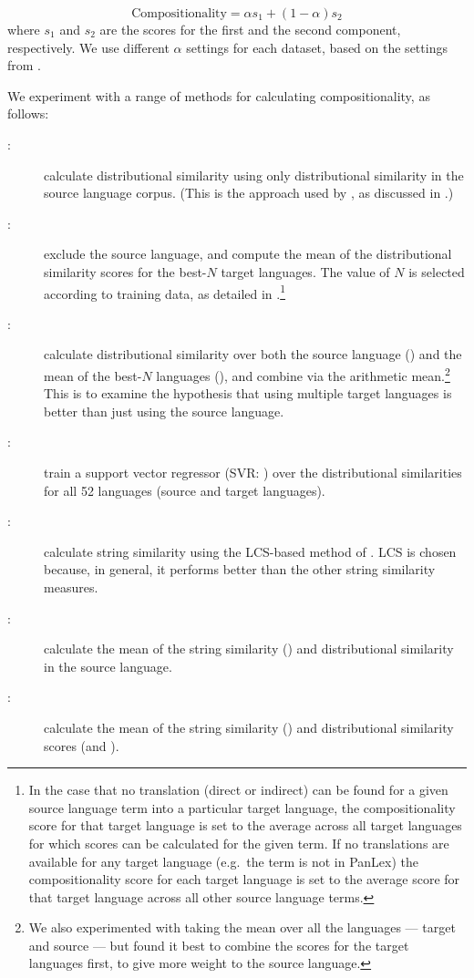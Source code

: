 \documentclass[output=paper
,modfonts
,nonflat]{langsci/langscibook}
\begin{document}
\begin{equation}
  \text{Compositionality} = \alpha s_{1} + (1-\alpha) s_{2}
  \label{eq:comp}
\end{equation} 
where $s_{1}$ and $s_{2}$ are the scores for the first and the second
component, respectively. We use different $\alpha$ settings for each
dataset, based on the settings from .

We experiment with a range of methods for calculating
compositionality, as follows:
\begin{description}
\item[\CSsource:] calculate distributional similarity using only
  distributional similarity in the source language corpus. (This is
  the approach used by \citet{reddy2011a}, as discussed in .)
\item[\CStarg:] exclude the source language, and compute the mean of
  the distributional similarity scores for the best-$N$ target
  languages. The value of $N$ is selected according to training data,
  as detailed in .\footnote{In the case
    that no translation (direct or indirect) can be found for a given
    source language term into a particular target language, the
    compositionality score for that target language is set to the
    average across all target languages for which scores can be
    calculated for the given term. If no translations are available
    for any target language (e.g.\ the term is not in PanLex) the
    compositionality score for each target language is set to the
    average score for that target language across all other source
    language terms.}
\item[\CSsourcetarg:] calculate distributional similarity over both the
  source language (\CSsource) and the mean of the best-$N$ languages
  (\CStarg), and combine via the arithmetic mean.\footnote{We also
    experimented with taking the mean over all the languages --- target
    and source --- but found it best to combine the scores for the
    target languages first, to give more weight to the source language.}
  This is to examine the hypothesis that using multiple target languages
  is better than just using the source language.
\item[\CSsvr:] train a support vector regressor (SVR:
  \citet{Smola:Scholkopf:2004}) over the distributional similarities
  for all 52 languages (source and target languages).
\item[\CSstring:] calculate string similarity using the LCS-based method
  of . 
	LCS is chosen because, in general, it performs better than 
	the other string similarity measures.
\item[\CSstringDS:] calculate the mean of the string similarity (\CSstring)
  and distributional similarity in the source language.
\item[\CSall:] calculate the mean of the string similarity (\CSstring)
  and distributional similarity scores (\CSsource and \CStarg).
\end{description}
\end{document}
